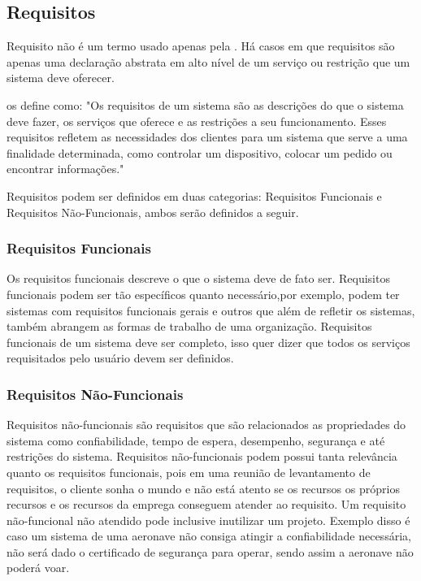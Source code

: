 \subsection{Requisitos}

Requisito não é um termo usado apenas pela \imprimircurso. Há casos em que requisitos são apenas uma declaração abstrata em alto nível de um serviço ou restrição que um sistema deve oferecer.

\cite{sommerville} os define como: "Os requisitos de um sistema são as descrições do que o sistema deve fazer, os serviços que oferece e as restrições a seu funcionamento. Esses requisitos refletem as necessidades dos clientes para um sistema que serve a uma finalidade determinada, como controlar um dispositivo, colocar um pedido ou encontrar informações."

Requisitos podem ser definidos em duas categorias: Requisitos Funcionais e Requisitos Não-Funcionais, ambos serão definidos a seguir.

\subsubsection{Requisitos Funcionais}

Os requisitos funcionais descreve o que o sistema deve de fato ser. Requisitos funcionais podem ser tão específicos quanto necessário,por exemplo, podem ter sistemas com requisitos funcionais gerais e outros que além de refletir os sistemas, também abrangem as formas de trabalho de uma organização. Requisitos funcionais de um sistema deve ser completo, isso quer dizer que todos os serviços requisitados pelo usuário devem ser definidos.

\subsubsection{Requisitos Não-Funcionais}

Requisitos não-funcionais são requisitos que são relacionados as propriedades do sistema como confiabilidade, tempo de espera, desempenho, segurança e até restrições do sistema. Requisitos não-funcionais podem possui tanta relevância quanto os requisitos funcionais, pois em uma reunião de levantamento de requisitos, o cliente sonha o mundo e não está atento se os recursos os próprios recursos e os recursos da emprega conseguem atender ao requisito. Um requisito não-funcional não atendido pode inclusive inutilizar um projeto. Exemplo disso é caso um sistema de uma aeronave não consiga atingir a confiabilidade necessária, não será dado o certificado de segurança para operar, sendo assim a aeronave não poderá voar. 

